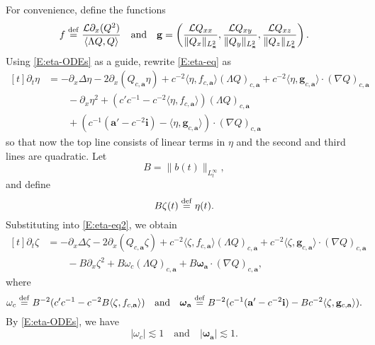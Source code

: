 \documentclass[12pt,letterpaper]{amsart}
\newcommand{\la}{\langle}
\newcommand{\ra}{\rangle}
\newcommand{\defeq}{\stackrel{\rm{def}}{=}}
\theoremstyle{remark}
\numberwithin{equation}{section}
\numberwithin{theorem}{section}
\numberwithin{table}{section}
\begin{document}
For convenience, define the functions
$$
f\defeq \frac{\mathcal{L}\partial_x (Q^2)}{\la \Lambda Q, Q\ra} \quad \mbox{and} \quad
\mathbf{g} = \left(  \frac{ \mathcal{L}Q_{xx} }{ \|Q_x\|_{L_{\mathbf{x}}^2}}, \frac{\mathcal{L}Q_{xy}}{ \|Q_y\|_{L_{\mathbf{x}}^2}}, \frac{\mathcal{L}Q_{xz} }{ \|Q_z\|_{L_{\mathbf{x}}^2}}\right). 
$$
Using \eqref{E:eta-ODEs} as a guide, rewrite \eqref{E:eta-eq} as
\begin{equation}
\label{E:eta-eq2}
\begin{aligned}[t]
\partial_t \eta &= - \partial_x \Delta \eta - 2 \partial_x ( Q_{c,\mathbf{a}} \eta) + c^{-2} \la \eta, f_{c,\mathbf{a}}\ra (\Lambda Q)_{c,\mathbf{a}} + c^{-2}\la \eta, \mathbf{g}_{c,\mathbf{a}} \ra \cdot (\nabla Q)_{c,\mathbf{a}}
 \\
& \qquad - \partial_x \eta^2 + (c'c^{-1}  - c^{-2} \la \eta, f_{c, \mathbf{a}}\ra ) (\Lambda Q)_{c,\mathbf{a}} \\
& \qquad + (c^{-1}(\mathbf{a}' - c^{-2} \mathbf{i}) -  \la \eta, \mathbf{g}_{c,\mathbf{a}}\ra )  \cdot (\nabla Q)_{c,\mathbf{a}}
\end{aligned}
\end{equation}
so that now the top line consists of linear terms in $\eta$ and the second and third lines are quadratic.  Let
$$
B = \|b(t) \|_{L_t^\infty},
$$
and define
$$
B \zeta(t) \defeq \eta(t).
$$
Substituting into \eqref{E:eta-eq2}, we obtain
\begin{equation}
\label{E:zeta-1}
\begin{aligned}[t]
\partial_t \zeta &= - \partial_x \Delta \zeta - 2 \partial_x ( Q_{c,\mathbf{a}} \zeta) + c^{-2} \la \zeta, f_{c,\mathbf{a}}\ra (\Lambda Q)_{c,\mathbf{a}} + c^{-2}\la \zeta, \mathbf{g}_{c,\mathbf{a}} \ra \cdot (\nabla Q)_{c,\mathbf{a}}
 \\
& \qquad - B \partial_x \zeta^2 + B \omega_c (\Lambda Q)_{c,\mathbf{a}} + B\boldsymbol{\omega}_{\mathbf{a}} \cdot (\nabla Q)_{c,\mathbf{a}},
\end{aligned}
\end{equation}
where
\begin{equation}
\label{E:omegas}
\omega_c \defeq B^{-2}(c'c^{-1}  - c^{-2} B\la \zeta, f_{c, \mathbf{a}}\ra)\quad \mbox{and} \quad \boldsymbol{\omega}_{\mathbf{a}} \defeq B^{-2}(c^{-1}(\mathbf{a}' - c^{-2} \mathbf{i}) -  Bc^{-2}\la \zeta, \mathbf{g}_{c,\mathbf{a}}\ra).
\end{equation}
By \eqref{E:eta-ODEs}, we have 
$$
|\omega_c| \lesssim 1 \quad \mbox{and} \quad |\boldsymbol{\omega}_{\mathbf{a}}| \lesssim 1.
$$
\end{document}
